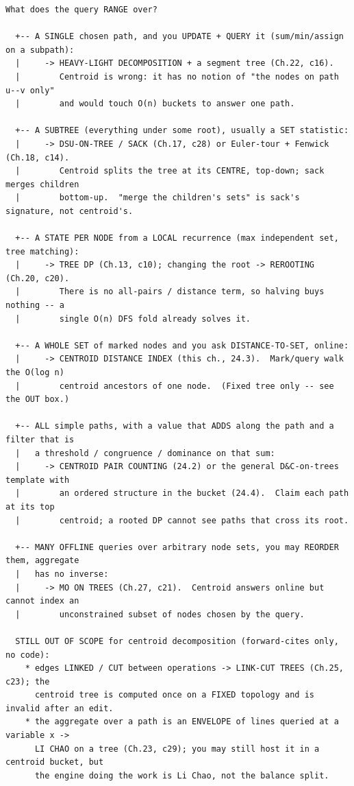 \begin{lstlisting}[language={}, basicstyle=\ttfamily\small, numbers=none, frame=single,
  caption={Decision ladder for tree-path problems. Read top to bottom and stop at the first branch that matches. Hands off to Chapters 13/17/22/25/27 whenever a different engine already owns the cell; centroid decomposition is the LAST resort for "all paths," not the first for "a path."}, label={lst:c18-map}]
  What does the query RANGE over?

  +-- A SINGLE chosen path, and you UPDATE + QUERY it (sum/min/assign on a subpath):
  |     -> HEAVY-LIGHT DECOMPOSITION + a segment tree (Ch.22, c16).
  |        Centroid is wrong: it has no notion of "the nodes on path u--v only"
  |        and would touch O(n) buckets to answer one path.

  +-- A SUBTREE (everything under some root), usually a SET statistic:
  |     -> DSU-ON-TREE / SACK (Ch.17, c28) or Euler-tour + Fenwick (Ch.18, c14).
  |        Centroid splits the tree at its CENTRE, top-down; sack merges children
  |        bottom-up.  "merge the children's sets" is sack's signature, not centroid's.

  +-- A STATE PER NODE from a LOCAL recurrence (max independent set, tree matching):
  |     -> TREE DP (Ch.13, c10); changing the root -> REROOTING (Ch.20, c20).
  |        There is no all-pairs / distance term, so halving buys nothing -- a
  |        single O(n) DFS fold already solves it.

  +-- A WHOLE SET of marked nodes and you ask DISTANCE-TO-SET, online:
  |     -> CENTROID DISTANCE INDEX (this ch., 24.3).  Mark/query walk the O(log n)
  |        centroid ancestors of one node.  (Fixed tree only -- see the OUT box.)

  +-- ALL simple paths, with a value that ADDS along the path and a filter that is
  |   a threshold / congruence / dominance on that sum:
  |     -> CENTROID PAIR COUNTING (24.2) or the general D&C-on-trees template with
  |        an ordered structure in the bucket (24.4).  Claim each path at its top
  |        centroid; a rooted DP cannot see paths that cross its root.

  +-- MANY OFFLINE queries over arbitrary node sets, you may REORDER them, aggregate
  |   has no inverse:
  |     -> MO ON TREES (Ch.27, c21).  Centroid answers online but cannot index an
  |        unconstrained subset of nodes chosen by the query.

  STILL OUT OF SCOPE for centroid decomposition (forward-cites only, no code):
    * edges LINKED / CUT between operations -> LINK-CUT TREES (Ch.25, c23); the
      centroid tree is computed once on a FIXED topology and is invalid after an edit.
    * the aggregate over a path is an ENVELOPE of lines queried at a variable x ->
      LI CHAO on a tree (Ch.23, c29); you may still host it in a centroid bucket, but
      the engine doing the work is Li Chao, not the balance split.
\end{lstlisting}

